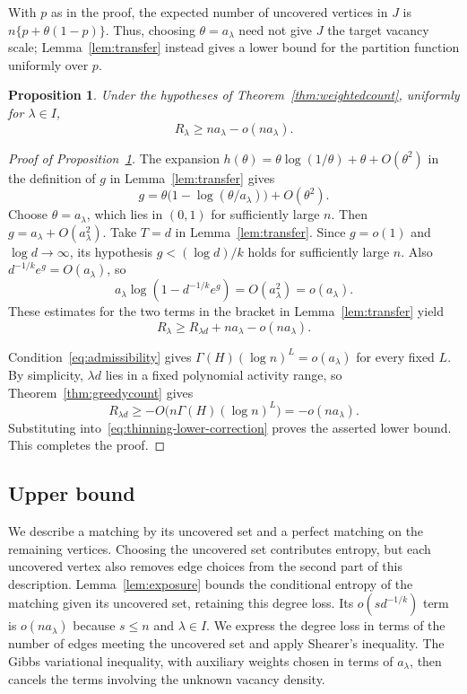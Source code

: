 \documentclass[11pt,reqno]{amsart}
\numberwithin{equation}{section}
\theoremstyle{plain}
\newtheorem{proposition}[theorem]{Proposition}
\theoremstyle{definition}
\begin{document}
With $p$ as in the proof, the expected number of uncovered vertices in $J$ is $n\{p+\theta(1-p)\}$.
Thus, choosing $\theta=a_\lambda$ need not give $J$ the target vacancy scale; Lemma~\ref{lem:transfer} instead gives a lower bound for the partition function uniformly over $p$.

\begin{proposition}\label{prop:countrefinement}
    Under the hypotheses of Theorem~\ref{thm:weightedcount}, uniformly for $\lambda\in I$,
    \[
        R_\lambda\ge na_\lambda-o(na_\lambda).
    \]
\end{proposition}
\begin{proof}[Proof of Proposition~\ref{prop:countrefinement}]
    The expansion $h(\theta)=\theta\log(1/\theta)+\theta+O(\theta^2)$ in the definition of $g$ in Lemma~\ref{lem:transfer} gives
    \[
        g=\theta\bigl(1-\log(\theta/a_\lambda)\bigr)+O(\theta^2).
    \]
    Choose $\theta=a_\lambda$, which lies in $(0,1)$ for sufficiently large $n$.
    Then $g=a_\lambda+O(a_\lambda^2)$.
    Take $T=d$ in Lemma~\ref{lem:transfer}.
    Since $g=o(1)$ and $\log d\to\infty$, its hypothesis $g<(\log d)/k$ holds for sufficiently large $n$.
    Also $d^{-1/k}e^g=O(a_\lambda)$, so
    \[
        a_\lambda\log(1-d^{-1/k}e^g)=O(a_\lambda^2)=o(a_\lambda).
    \]
    These estimates for the two terms in the bracket in Lemma~\ref{lem:transfer} yield
    \begin{equation}\label{eq:thinning-lower-correction}
        R_\lambda\ge R_{\lambda d}+na_\lambda-o(na_\lambda).
    \end{equation}

    Condition~\eqref{eq:admissibility} gives $\Gamma(H)(\log n)^L=o(a_\lambda)$ for every fixed $L$.
    By simplicity, $\lambda d$ lies in a fixed polynomial activity range, so Theorem~\ref{thm:greedycount} gives
    \[
        R_{\lambda d}\ge-O\bigl(n\Gamma(H)(\log n)^L\bigr)=-o(na_\lambda).
    \]
    Substituting into~\eqref{eq:thinning-lower-correction} proves the asserted lower bound.
    This completes the proof.
\end{proof}


\subsection{Upper bound}\label{subsec:countupper}

We describe a matching by its uncovered set and a perfect matching on the remaining vertices.
Choosing the uncovered set contributes entropy, but each uncovered vertex also removes edge choices from the second part of this description.
Lemma~\ref{lem:exposure} bounds the conditional entropy of the matching given its uncovered set, retaining this degree loss.
Its $o(sd^{-1/k})$ term is $o(na_\lambda)$ because $s\le n$ and $\lambda\in I$.
We express the degree loss in terms of the number of edges meeting the uncovered set and apply Shearer's inequality.
The Gibbs variational inequality, with auxiliary weights chosen in terms of $a_\lambda$, then cancels the terms involving the unknown vacancy density.
\end{document}
